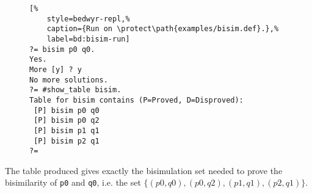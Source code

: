 \begin{figure}[ht]
  \centering
  
\end{figure}

\begin{figure}[ht]
  \centering
  \begin{lstlisting}[%
    style=bedwyr-repl,%
    caption={Run on \protect\path{examples/bisim.def}.},%
    label=bd:bisim-run]
?= bisim p0 q0.
Yes.
More [y] ? y
No more solutions.
?= #show_table bisim.
Table for bisim contains (P=Proved, D=Disproved):
 [P] bisim p0 q0
 [P] bisim p0 q2
 [P] bisim p1 q1
 [P] bisim p2 q1
?=
  \end{lstlisting}
\end{figure}
The table produced gives exactly the bisimulation set
needed to prove the bisimilarity of \lstinline+p0+ and \lstinline+q0+,
i.e. the set $\{(p0,q0), (p0, q2), (p1,q1), (p2,q1) \}.$











